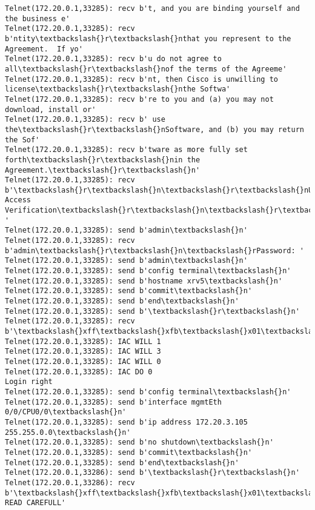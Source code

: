 \documentclass[11pt]{article}
\begin{document}
\begin{Verbatim}[commandchars=\\\{\}]
Telnet(172.20.0.1,33285): recv b't, and you are binding yourself and the business e'
Telnet(172.20.0.1,33285): recv b'ntity\textbackslash{}r\textbackslash{}nthat you represent to the Agreement.  If yo'
Telnet(172.20.0.1,33285): recv b'u do not agree to all\textbackslash{}r\textbackslash{}nof the terms of the Agreeme'
Telnet(172.20.0.1,33285): recv b'nt, then Cisco is unwilling to license\textbackslash{}r\textbackslash{}nthe Softwa'
Telnet(172.20.0.1,33285): recv b're to you and (a) you may not download, install or'
Telnet(172.20.0.1,33285): recv b' use the\textbackslash{}r\textbackslash{}nSoftware, and (b) you may return the Sof'
Telnet(172.20.0.1,33285): recv b'tware as more fully set forth\textbackslash{}r\textbackslash{}nin the Agreement.\textbackslash{}r\textbackslash{}n'
Telnet(172.20.0.1,33285): recv b'\textbackslash{}r\textbackslash{}n\textbackslash{}r\textbackslash{}nUser Access Verification\textbackslash{}r\textbackslash{}n\textbackslash{}r\textbackslash{}nUsername: '
Telnet(172.20.0.1,33285): send b'admin\textbackslash{}n'
Telnet(172.20.0.1,33285): recv b'admin\textbackslash{}r\textbackslash{}n\textbackslash{}rPassword: '
Telnet(172.20.0.1,33285): send b'admin\textbackslash{}n'
Telnet(172.20.0.1,33285): send b'config terminal\textbackslash{}n'
Telnet(172.20.0.1,33285): send b'hostname xrv5\textbackslash{}n'
Telnet(172.20.0.1,33285): send b'commit\textbackslash{}n'
Telnet(172.20.0.1,33285): send b'end\textbackslash{}n'
Telnet(172.20.0.1,33285): send b'\textbackslash{}r\textbackslash{}n'
Telnet(172.20.0.1,33285): recv b'\textbackslash{}xff\textbackslash{}xfb\textbackslash{}x01\textbackslash{}xff\textbackslash{}xfb\textbackslash{}x03\textbackslash{}xff\textbackslash{}xfb\textbackslash{}x00\textbackslash{}xff\textbackslash{}xfd\textbackslash{}x00\textbackslash{}x1b]0;xrv5\textbackslash{}x07\textbackslash{}r\textbackslash{}n\textbackslash{}rRP/0/0/CPU0:xrv5\#\textbackslash{}r\textbackslash{}n\textbackslash{}rRP/0/0'
Telnet(172.20.0.1,33285): IAC WILL 1
Telnet(172.20.0.1,33285): IAC WILL 3
Telnet(172.20.0.1,33285): IAC WILL 0
Telnet(172.20.0.1,33285): IAC DO 0
Login right
Telnet(172.20.0.1,33285): send b'config terminal\textbackslash{}n'
Telnet(172.20.0.1,33285): send b'interface mgmtEth 0/0/CPU0/0\textbackslash{}n'
Telnet(172.20.0.1,33285): send b'ip address 172.20.3.105 255.255.0.0\textbackslash{}n'
Telnet(172.20.0.1,33285): send b'no shutdown\textbackslash{}n'
Telnet(172.20.0.1,33285): send b'commit\textbackslash{}n'
Telnet(172.20.0.1,33285): send b'end\textbackslash{}n'
Telnet(172.20.0.1,33286): send b'\textbackslash{}r\textbackslash{}n'
Telnet(172.20.0.1,33286): recv b'\textbackslash{}xff\textbackslash{}xfb\textbackslash{}x01\textbackslash{}xff\textbackslash{}xfb\textbackslash{}x03\textbackslash{}xff\textbackslash{}xfb\textbackslash{}x00\textbackslash{}xff\textbackslash{}xfd\textbackslash{}x00\textbackslash{}x1b]0;xrv6\textbackslash{}x07\textbackslash{}r\textbackslash{}n\textbackslash{}r\textbackslash{}nIMPORTANT:  READ CAREFULL'

\end{Verbatim}
\end{document}
